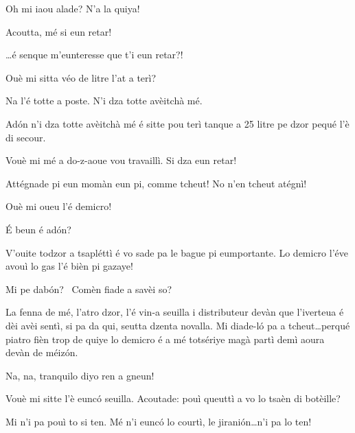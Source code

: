 \begin{drama}
\Pierluigispeaks{} Oh mi iaou alade? N'a la quiya!
 
\Lucianospeaks Acoutta, mé si eun retar!

\Pierluigispeaks \ldots é senque m'eunteresse que t'i eun retar?!


\Lucianospeaks Ouè mi sitta véo de litre l'at a terì?


\Prosperospeaks{} Na l'é totte a poste.  N'i dza totte avèitchà mé. 


\Prosperospeaks Ad\'on n'i dza totte avèitchà mé é sitte pou terì tanque a 25 litre pe dzor pequé l'è di secour.

\Lucianospeaks Vouè mi mé a do-z-aoue vou travaillì. Si dza eun retar! 

\Prosperospeaks Attégnade pi eun momàn eun pi, comme tcheut! No n'en tcheut atégnì!

\Lucianospeaks Ouè mi oueu l'é demicro!

\Prosperospeaks \'E beun é ad\'on?

\Lucianospeaks V'ouite todzor a tsapléttì é vo sade pa le bague pi eumportante. Lo demicro l'éve avouì lo gas l'é bièn pi gazaye!

\Prosperospeaks Mi pe dab\'on? \confuso\ Comèn fiade a savèi so?

\Lucianospeaks La fenna de mé, l'atro dzor, l'é vin-a seuilla i distributeur devàn que l’iverteua é dèi avèi sentì, si pa da qui, seutta dzenta novalla. Mi diade-l\'o pa a tcheut\ldots perqué piatro fièn trop de quiye lo demicro é a mé totsériye magà partì demì aoura devàn de méiz\'on.

\Prosperospeaks Na, na, tranquilo diyo ren a gneun!

\Lucianospeaks {} Vouè mi sitte l'è eunc\'o seuilla.  Acoutade: pouì queuttì a vo lo tsaèn di botèille?

\Prosperospeaks Mi n'i pa pouì to si ten. Mé n'i eunc\'o lo courtì, le jirani\'on\ldots n'i pa lo ten!


\end{drama}
